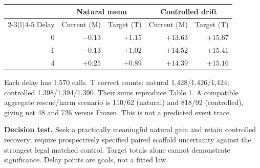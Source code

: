 \documentclass[10pt,letterpaper]{article}
\newcommand{\T}[1]{{\color{GuideBlue}#1}}
\newcommand{\note}[1]{{\fontsize{8.5}{10.5}\selectfont #1\par}}
\newenvironment{clean}{\begin{center}\fontsize{9.5}{11.5}\selectfont\setlength{\tabcolsep}{8pt}\renewcommand{\arraystretch}{1.10}}{\end{center}}
\begin{document}
\par\noindent\begin{minipage}{\linewidth}\end{minipage}\par
\begin{clean}
\begin{tabular}{@{}rrrrr@{}}
\toprule
& \multicolumn{2}{c}{Natural menu} & \multicolumn{2}{c}{Controlled drift} \\
\cmidrule(lr){2-3}\cmidrule(l){4-5}
Delay & Current (M) & Target (T) & Current (M) & Target (T) \\
\midrule
0 & $-0.13$ & \T{$+1.15$} & $+13.63$ & \T{$+15.67$} \\
1 & $-0.13$ & \T{$+1.02$} & $+14.52$ & \T{$+15.41$} \\
4 & $+0.25$ & \T{$+0.89$} & $+14.39$ & \T{$+15.16$} \\

\bottomrule
\end{tabular}
\end{clean}
\note{Each delay has 1,570 calls. T correct counts: natural 1,428/1,426/1,424; controlled 1,398/1,394/1,390. Their sums reproduce Table 1. A compatible aggregate rescue/harm scenario is 110/62 (natural) and 818/92 (controlled), giving net 48 and 726 versus Frozen. This is not a predicted event trace.}
\textbf{Decision test.} Seek a practically meaningful natural gain and retain controlled recovery; require prospectively specified paired scaffold uncertainty against the strongest legal matched control. Target totals alone cannot demonstrate significance. Delay points are goals, not a fitted law.
\end{document}
